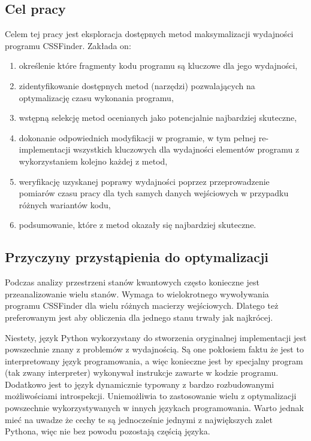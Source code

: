 \documentclass[11pt, a4paper]{article}
\begin{document}
\begin{sloppypar}
    \subsection{Cel pracy}
    Celem tej pracy jest eksploracja dostępnych metod maksymalizacji wydajności programu
    CSSFinder. Zakłada on:
    \begin{enumerate}
      \item określenie które fragmenty kodu programu są kluczowe dla jego wydajności,

      \item zidentyfikowanie dostępnych metod (narzędzi) pozwalających na optymalizację czasu
        wykonania programu,

      \item wstępną selekcję metod ocenianych jako potencjalnie najbardziej skuteczne,

      \item dokonanie odpowiednich modyfikacji w programie, w tym pełnej re-implementacji
        wszystkich kluczowych dla wydajności elementów programu z wykorzystaniem kolejno
        każdej z metod,

      \item weryfikację uzyskanej poprawy wydajności poprzez przeprowadzenie pomiarów czasu
        pracy dla tych samych danych wejściowych w przypadku różnych wariantów kodu,

      \item podsumowanie, które z metod okazały się najbardziej skuteczne.
    \end{enumerate}

    \subsection{Przyczyny przystąpienia do optymalizacji}
    Podczas analizy przestrzeni stanów kwantowych często konieczne jest przeanalizowanie
    wielu stanów. Wymaga to wielokrotnego wywoływania programu CSSFinder dla wielu
    różnych macierzy wejściowych. Dlatego też preferowanym jest aby obliczenia dla jednego
    stanu trwały jak najkrócej.

    Niestety, język Python wykorzystany do stworzenia oryginalnej implementacji jest
    powszechnie znany z problemów z wydajnością\cite{srinath2017python}. Są one
    pokłosiem faktu że jest to interpretowany język programowania, a więc konieczne jest
    by specjalny program (tak zwany interpreter) wykonywał instrukcje zawarte w kodzie programu.
    Dodatkowo jest to język dynamicznie typowany z bardzo rozbudowanymi możliwościami
    introspekcji. Uniemożliwia to zastosowanie wielu z optymalizacji powszechnie wykorzystywanych
    w innych językach programowania. Warto jednak mieć na uwadze że cechy te są
    jednocześnie jednymi z największych zalet Pythona, więc nie bez powodu pozostają częścią
    języka.


\end{sloppypar}
\end{document}
